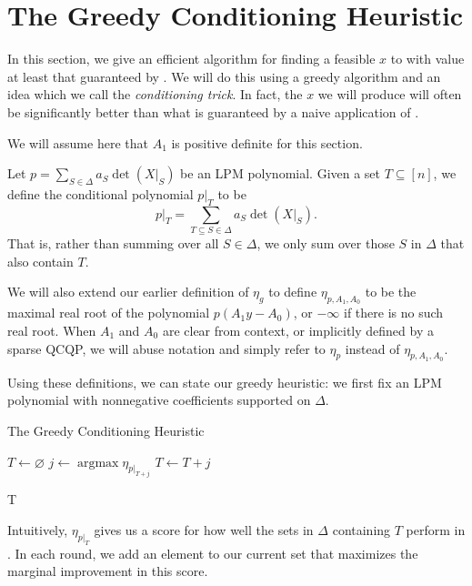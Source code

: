 \documentclass{amsart}
\theoremstyle{definition}
\DeclareMathOperator{\argmax}{argmax}
\begin{document}
\section{The Greedy Conditioning Heuristic}
\label{subsec:heuristic}
In this section, we give an efficient algorithm for finding a feasible $x$ to  with value at least that guaranteed by .
We will do this using a greedy algorithm and an idea which we call the \emph{conditioning trick}.
In fact, the $x$ we will produce will often be significantly better than what is guaranteed by a naive application of .

We will assume here that $A_1$ is positive definite for this section.

Let $p = \sum_{S \in \Delta} a_S \det(X|_S)$ be an LPM polynomial.
Given a set $T \subseteq [n]$, we define the conditional polynomial $p|_T$ to be
\[
    p|_T = \sum_{T\subseteq S \in \Delta} a_S \det(X|_S).
\]
That is, rather than summing over all $S \in \Delta$, we only sum over those $S$ in $\Delta$ that also contain $T$.

We will also extend our earlier definition of $\eta_g$ to define $\eta_{p, A_1, A_0}$ to be the maximal real root of the polynomial $p(A_1 y - A_0)$, or $-\infty$ if there is no such real root.
When $A_1$ and $A_0$ are clear from context, or implicitly defined by a sparse QCQP, we will abuse notation and simply refer to  $\eta_p$ instead of $\eta_{p, A_1, A_0}$.

Using these definitions, we can state our greedy heuristic:
we first fix an LPM polynomial with nonnegative coefficients supported on $\Delta$.
\begin{algorithm}
    \caption{The Greedy Conditioning Heuristic}
    \label{alg:greedy}
    \begin{algorithmic}
        \State $T \gets \varnothing$
            \State $j \gets \argmax \eta_{p|_{T + j}}$
            \State $T \gets T + j$
        \EndFor

        \Return T
    \end{algorithmic}
\end{algorithm}
Intuitively, $\eta_{p|_T}$ gives us a score for how well the sets in $\Delta$ containing $T$ perform in .
In each round, we add an element to our current set that maximizes the marginal improvement in this score.
\end{document}
